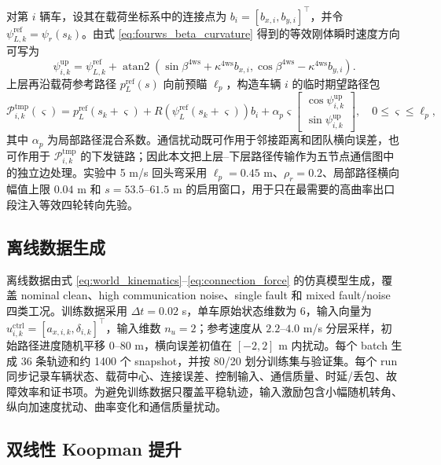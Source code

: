 \documentclass[twocolumn,3p,times,procedia]{elsarticle}
\begin{document}
对第 $i$ 辆车，设其在载荷坐标系中的连接点为 $b_i=[b_{x,i},b_{y,i}]^\top$，并令 $\psi_{L,k}^{\mathrm{ref}}=\psi_r(s_k)$。由式 \eqref{eq:fourws_beta_curvature} 得到的等效刚体瞬时速度方向可写为
\begin{equation}
\psi_{i,k}^{\mathrm{up}}=
\psi_{L,k}^{\mathrm{ref}}+
\operatorname{atan2}\!\left(
\sin\beta^{\mathrm{4ws}}+\kappa^{\mathrm{4ws}} b_{x,i},
\cos\beta^{\mathrm{4ws}}-\kappa^{\mathrm{4ws}} b_{y,i}
\right).
\label{eq:fourws_vehicle_heading}
\end{equation}
上层再沿载荷参考路径 $p_L^{\mathrm{ref}}(s)$ 向前预瞄 $\ell_p$，构造车辆 $i$ 的临时期望路径包
\begin{equation}
\mathcal P_{i,k}^{\mathrm{tmp}}(\varsigma)=
p_{L}^{\mathrm{ref}}(s_k+\varsigma)+
R\!\left(\psi_L^{\mathrm{ref}}(s_k+\varsigma)\right)b_i+
\alpha_p \varsigma
\begin{bmatrix}
\cos \psi_{i,k}^{\mathrm{up}}\\
\sin \psi_{i,k}^{\mathrm{up}}
\end{bmatrix},
\quad 0\le\varsigma\le\ell_p ,
\label{eq:fourws_local_path}
\end{equation}
其中 $\alpha_p$ 为局部路径混合系数。通信扰动既可作用于邻接距离和团队横向误差，也可作用于 $\mathcal P_{i,k}^{\mathrm{tmp}}$ 的下发链路；因此本文把上层--下层路径传输作为五节点通信图中的独立边处理。实验中 5 m/s 回头弯采用 $\ell_p=0.45$ m、$\rho_r=0.2$、局部路径横向幅值上限 $0.04$ m 和 $s=53.5$--$61.5$ m 的启用窗口，用于只在最需要的高曲率出口段注入等效四轮转向先验。

\subsection{离线数据生成}

离线数据由式 \eqref{eq:world_kinematics}--\eqref{eq:connection_force} 的仿真模型生成，覆盖 nominal clean、high communication noise、single fault 和 mixed fault/noise 四类工况。训练数据采用 $\Delta t=0.02$ s，单车原始状态维数为 $6$，输入向量为 $u_{i,k}^{\mathrm{ctrl}}=[a_{x,i,k},\delta_{i,k}]^\top$，输入维数 $n_u=2$；参考速度从 $2.2$--$4.0$ m/s 分层采样，初始路径进度随机平移 $0$--$80$ m，横向误差初值在 $[-2,2]$ m 内扰动。每个 batch 生成 36 条轨迹和约 1400 个 snapshot，并按 80/20 划分训练集与验证集。每个 run 同步记录车辆状态、载荷中心、连接误差、控制输入、通信质量、时延/丢包、故障效率和证书项。为避免训练数据只覆盖平稳轨迹，输入激励包含小幅随机转角、纵向加速度扰动、曲率变化和通信质量扰动。

\subsection{双线性 Koopman 提升}
\end{document}
